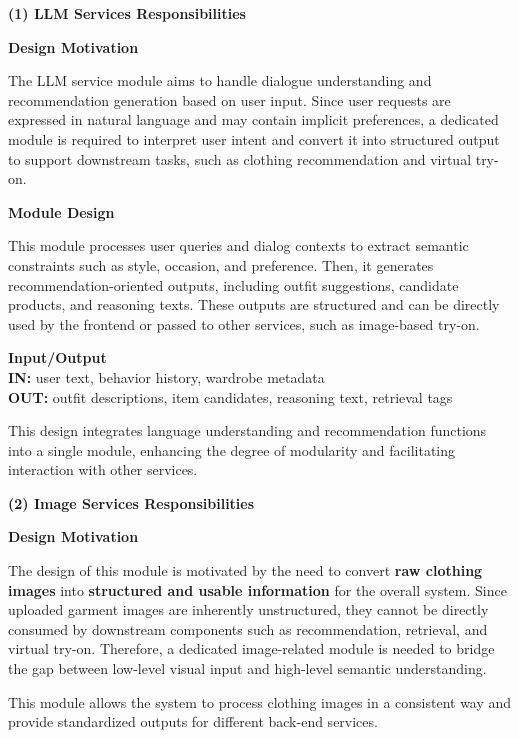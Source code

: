 \vspace{0.5cm}
\textbf{\large (1) LLM Services Responsibilities}

\textbf{Design Motivation} 

The LLM service module aims to handle dialogue understanding and recommendation generation based on user input. Since user requests are expressed in natural language and may contain implicit preferences, a dedicated module is required to interpret user intent and convert it into structured output to support downstream tasks, such as clothing recommendation and virtual try-on.

\textbf{Module Design} 

This module processes user queries and dialog contexts to extract semantic constraints such as style, occasion, and preference. Then, it generates recommendation-oriented outputs, including outfit suggestions, candidate products, and reasoning texts. These outputs are structured and can be directly used by the frontend or passed to other services, such as image-based try-on.

\textbf{Input/Output}\\[0.3cm]
\textbf{IN:} user text, behavior history, wardrobe metadata\\[0.2cm]
\textbf{OUT:} outfit descriptions, item candidates, reasoning text, retrieval tags

This design integrates language understanding and recommendation functions into a single module, enhancing the degree of modularity and facilitating interaction with other services.

\vspace{0.5cm}

\textbf{\large (2) Image Services Responsibilities}

\textbf{Design Motivation} 

The design of this module is motivated by the need to convert \textbf{raw clothing images} into \textbf{structured and usable information} for the overall system. Since uploaded garment images are inherently unstructured, they cannot be directly consumed by downstream components such as recommendation, retrieval, and virtual try-on. Therefore, a dedicated image-related module is needed to bridge the gap between low-level visual input and high-level semantic understanding. 

This module allows the system to process clothing images in a consistent way and provide standardized outputs for different back-end services.

